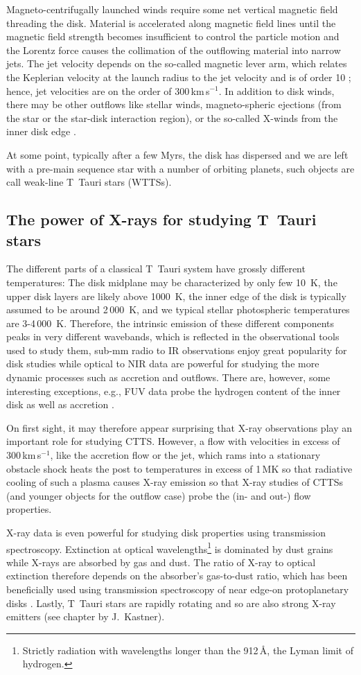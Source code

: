 Magneto-centrifugally launched winds require some net vertical magnetic field threading the disk. Material is accelerated along magnetic field lines until the magnetic field strength becomes insufficient to control the particle motion and the Lorentz force causes the collimation of the outflowing material into narrow jets. The jet velocity depends on the so-called magnetic lever arm, which relates the Keplerian velocity at the launch radius to the jet velocity and is of order 10 \citep{}; hence, jet velocities are on the order of 300\,km\,s$^{-1}$. In addition to disk winds, there may be other outflows like stellar winds, magneto-spheric ejections (from the star or the star-disk interaction region), or the so-called X-winds from the inner disk edge \citep{Shu_1994}.

At some point, typically after a few Myrs, the disk has dispersed \citep{} and we are left with a pre-main sequence star with a number of orbiting planets, such objects are call weak-line T~Tauri stars (WTTSs).

\subsection{The power of X-rays for studying T~Tauri stars}
The different parts of a classical T~Tauri system have grossly different temperatures: The disk midplane may be characterized by only few 10~K, the upper disk layers are likely above 1000~K, the inner edge of the disk is typically assumed to be around 2\,000~K, and we typical stellar photospheric temperatures are 3-4\,000~K. Therefore, the intrinsic emission of these different components peaks in very different wavebands, which is reflected in the observational tools used to study them, sub-mm radio to IR observations enjoy great popularity for disk studies while optical to NIR data are powerful for studying the more dynamic processes such as accretion and outflows. There are, however, some interesting exceptions, e.g., FUV data probe the hydrogen content of the inner disk as well as accretion \citep[see review by][]{Schneider_2020}.

On first sight, it may therefore appear surprising that X-ray observations play an important role for studying CTTS. However, a flow with velocities in excess of 300\,km\,s$^{-1}$, like the accretion flow or the jet, which rams into a stationary obstacle shock heats the post to temperatures in excess of 1\,MK  so that radiative cooling of such a plasma causes X-ray emission so that X-ray studies of CTTSs (and younger objects for the outflow case) probe the (in- and out-) flow properties.

X-ray data is even powerful for studying disk properties using transmission spectroscopy. Extinction at optical wavelengths\footnote{Strictly radiation with wavelengths longer than the 912\,\AA{}, the Lyman limit of hydrogen.} is dominated by dust grains while X-rays are absorbed by gas and dust. The ratio of X-ray to optical extinction therefore depends on the absorber's gas-to-dust ratio, which has been beneficially used using transmission spectroscopy of near edge-on protoplanetary disks \citep{}. Lastly, T~Tauri stars are rapidly rotating and so are also strong X-ray emitters (see chapter by J.~Kastner).
